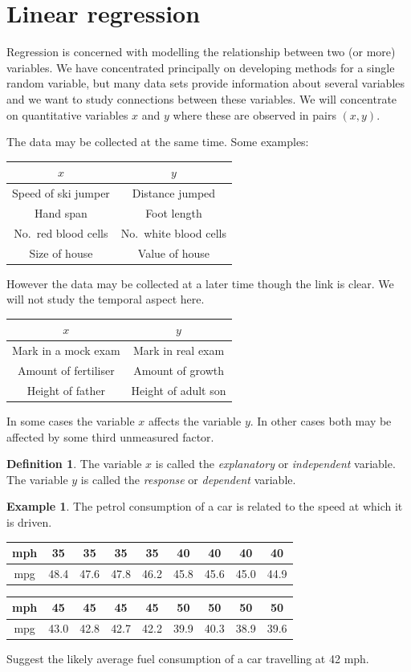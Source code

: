 \documentclass[
]{book}
\theoremstyle{definition}
\newtheorem{definition}{Definition}[chapter]
\theoremstyle{definition}
\newtheorem{example}{Example}[chapter]
\theoremstyle{definition}
\theoremstyle{definition}
\theoremstyle{remark}
\begin{document}
\hypertarget{linear-regression}{%
\section{Linear regression}\label{linear-regression}}

Regression is concerned with modelling the relationship between two (or more) variables. We have concentrated principally on developing methods for a single random variable, but many data sets provide information about several variables and we want to study connections between these variables. We will concentrate on quantitative variables \(x\) and \(y\) where these are observed in pairs \((x,y)\).

The data may be collected at the same time. Some examples:

\begin{longtable}[]{@{}cc@{}}
\toprule
\(x\) & \(y\)\tabularnewline
\midrule
\endhead
Speed of ski jumper & Distance jumped\tabularnewline
Hand span & Foot length\tabularnewline
No.~red blood cells & No.~white blood cells\tabularnewline
Size of house & Value of house\tabularnewline
\bottomrule
\end{longtable}

However the data may be collected at a later time though the link is clear. We will not study the temporal aspect here.

\begin{longtable}[]{@{}cc@{}}
\toprule
\(x\) & \(y\)\tabularnewline
\midrule
\endhead
Mark in a mock exam & Mark in real exam\tabularnewline
Amount of fertiliser & Amount of growth\tabularnewline
Height of father & Height of adult son\tabularnewline
\bottomrule
\end{longtable}

In some cases the variable \(x\) affects the variable \(y\). In other cases both may be affected by some third unmeasured factor.

\begin{definition}
The variable \(x\) is called the \emph{explanatory} or \emph{independent} variable. The variable \(y\) is called the \emph{response} or \emph{dependent} variable.
\end{definition}

\begin{example}
The petrol consumption of a car is related to the speed at which it is driven.

\begin{longtable}[]{@{}ccccccccc@{}}
\toprule
mph & 35 & 35 & 35 & 35 & 40 & 40 & 40 & 40\tabularnewline
\midrule
\endhead
mpg & 48.4 & 47.6 & 47.8 & 46.2 & 45.8 & 45.6 & 45.0 & 44.9\tabularnewline
\bottomrule
\end{longtable}

\begin{longtable}[]{@{}ccccccccc@{}}
\toprule
mph & 45 & 45 & 45 & 45 & 50 & 50 & 50 & 50\tabularnewline
\midrule
\endhead
mpg & 43.0 & 42.8 & 42.7 & 42.2 & 39.9 & 40.3 & 38.9 & 39.6\tabularnewline
\bottomrule
\end{longtable}

Suggest the likely average fuel consumption of a car travelling at 42 mph.
\end{example}
\end{document}
